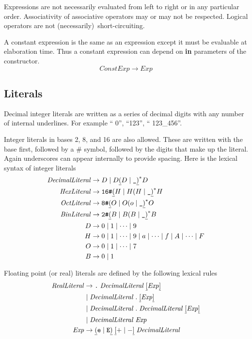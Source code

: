 \documentclass{article}%
\begin{document}
Expressions are not necessarily evaluated from left to right or in any
particular order. Associativity of associative operators may or may not be
respected. Logical operators are not (necessarily)\ short-circuiting.

A constant expression is the same as an expression except it must be evaluable
at elaboration time. Thus a constant expression can depend on \textbf{in}
parameters of the constructor.%
\[
ConstExp\rightarrow Exp
\]


\subsection{Literals}

Decimal integer literals are written as a series of decimal digits with any
number of internal underlines. For example \textquotedblleft%
0\textquotedblright, \textquotedblleft123\textquotedblright, \textquotedblleft%
123\_456\textquotedblright.

Integer literals in bases 2, 8, and 16 are also allowed. These are written
with the base first, followed by a \# symbol, followed by the digits that make
up the literal. Again underscores can appear internally to provide spacing.
Here is the lexical syntax of integer literals%
\begin{align*}
\mathit{DecimalLiteral}  &  \rightarrow D\mid D\underline{(}D\mid
\text{\texttt{\_}}\underline{)}^{\ast}D\\
\mathit{HexLiteral}  &  \rightarrow\text{\texttt{16\#}}\underline{(}H\mid
H(H\mid\text{\texttt{\_}}\underline{)}^{\ast}H\\
\mathit{OctLiteral}  &  \rightarrow\text{\texttt{8\#}}\underline{(}O\mid
O(o\mid\text{\texttt{\_}}\underline{)}^{\ast}O\\
\mathit{BinLiteral}  &  \rightarrow\text{\texttt{2\#}}\underline{(}B\mid
B(B\mid\text{\texttt{\_}}\underline{)}^{\ast}B\\
D  &  \rightarrow0\mid1\mid\cdots\mid9\\
H  &  \rightarrow0\mid1\mid\cdots\mid9\mid a\mid\cdots\mid f\mid A\mid
\cdots\mid F\\
O  &  \rightarrow0\mid1\mid\cdots\mid7\\
B  &  \rightarrow0\mid1
\end{align*}


Floating point (or real) literals are defined by the following lexical rules%
\begin{align*}
\mathit{RealLiteral}  &  \rightarrow\text{\texttt{.}}\;\mathit{DecimalLiteral}%
\;\underline{[}\mathit{Exp}\underline{]}\\
&  \mid\mathit{DecimalLiteral}\;\mathtt{.}\;\underline{[}\mathit{Exp}%
\underline{]}\\
&  \mid\mathit{DecimalLiteral}\;\mathtt{.}\;\mathit{DecimalLiteral\;}%
\underline{[}\mathit{Exp}\underline{]}\\
&  \mid\mathit{DecimalLiteral}\;\mathit{Exp}\\
\mathit{Exp}  &  \rightarrow\underline{(}\mathtt{e}\mid\mathtt{E}%
\underline{)}\;\underline{[}\mathtt{+}\mid\mathtt{-}\underline{]}%
\;\mathit{DecimalLiteral}%
\end{align*}
\end{document}
